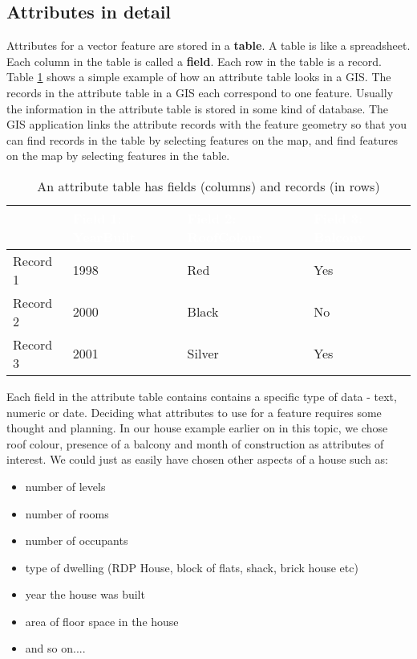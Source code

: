 \subsection{Attributes in detail}

Attributes for a vector feature are stored in a \textbf{table}. A table is like a
spreadsheet. Each column in the table is called a \textbf{field}. Each row in the
table is a record. Table \ref{tab:attributes} shows a simple example of how
an attribute
table looks in a GIS. The records in the attribute table in a GIS each
correspond to one feature. Usually the information in the attribute table is
stored in some kind of database. The GIS application links the attribute
records with the feature geometry so that you can find records in the table
by selecting features on the map, and find features on the map by selecting
features in the table.

\begin{table}[ht]
\centering
\caption{An attribute table has fields (columns) and records (in rows)}\medskip
 \label{tab:attributes}
 \begin{tabular}{|p{4cm}|p{4cm}|p{4cm}|p{4cm}|}
 \hline
 \rowcolor{black}
 &
 \textcolor{white}{\textbf{Field 1: YearBuilt}} & 
 \textcolor{white}{\textbf{Field 2: RoofColour}} &
 \textcolor{white}{\textbf{Field 3: Balcony}} \\
 \hline Record 1 & 1998 & Red & Yes \\
 \hline Record 2 & 2000 & Black & No \\
 \hline Record 3 & 2001 & Silver & Yes\\
\hline
\end{tabular}
\end{table}

Each field in the attribute table contains contains a specific type of data -
text, numeric or date. Deciding what attributes to use for a feature requires
some thought and planning. In our house example earlier on in this topic, we
chose roof colour, presence of a balcony and month of construction as
attributes of interest. We could just as easily have chosen other aspects of
a house such as:

\begin{itemize}
\item number of levels
\item number of rooms
\item number of occupants
\item type of dwelling (RDP House, block of flats, shack, brick house etc)
\item year the house was built
\item area of floor space in the house
\item and so on....
\end{itemize}

